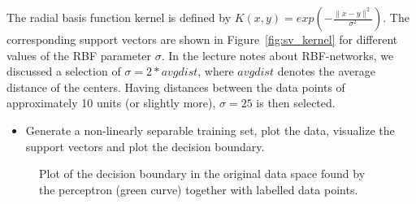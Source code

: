 \documentclass[a4]{article}
\begin{document}
The radial basis function kernel is defined by $K(x,y) = exp(-\frac{\|x-y\|^2}{\sigma^2})$.
The corresponding support vectors are shown in Figure~\ref{fig:sv_kernel} for different values of the RBF parameter $\sigma$. In the lecture notes about RBF-networks, we discussed a selection of $\sigma= 2*avgdist$, where $avgdist$ denotes the average distance of the centers. Having distances between the data points of approximately 10 units (or slightly more), $\sigma= 25$ is then selected.

\begin{itemize}
\item Generate a non-linearly separable training set, plot the data, visualize the support vectors and plot the decision boundary.
\end{itemize}
\begin{figure}[!h]
	\begin{center}
		\centering
	\end{center}
	\caption{\label{fig:perceptron}Plot of the decision boundary in the original data space found by the perceptron (green curve) together with labelled data points.}
\end{figure}





% 
% 
\end{document}
